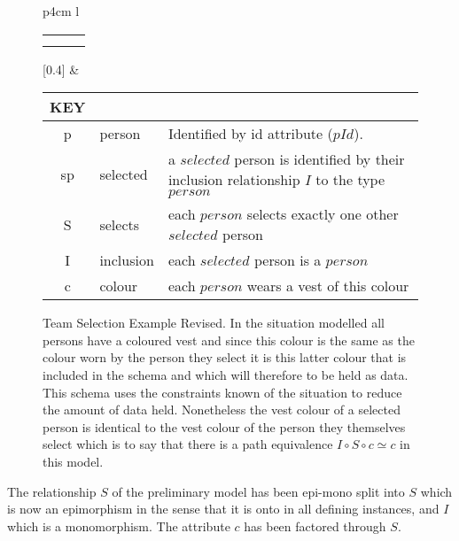 \begin{figure} [h]
\begin{center}
\begin{tabular}{p{4cm}  l }
\begin{tabular}{c p{1.5cm} c}
   \Rnode{sp}{\rnode{sps}{s}\rnode{spp}{p}} & &    \\[1.4cm]
   \Rnode{p}{p}   & & \Rnode{v}{v}
\end{tabular}
\idcomp
{}
[0.4]
\idcomp &\footnotesize
\begin{tabular}{c p{1.5cm} p{4cm}}
KEY && \\
\hline
p & person & Identified by id attribute ($pId$). \\
sp & selected & a $selected$ person is identified by their inclusion relationship $I$ to the type $person$ \\
S & selects & each $person$ selects exactly one other $selected$ person \\
I & inclusion & each $selected$ person is a $person$ \\
c & colour & each $person$ wears a vest of this colour 
\end{tabular} 
\end{tabular}
\end{center}
\caption{Team Selection Example Revised. 
In the situation modelled all persons have a coloured vest and since this colour is the same as the colour 
worn by the person they select it is this latter colour that is included in the schema and which will therefore to be held as data. 
This schema uses the constraints known of the situation to reduce the amount of data held.
Nonetheless the  vest colour  of a selected person is 
identical to the vest colour of the person they themselves select which is to say that there is a  path equivalence $I \circ S \circ c \simeq c$ in this model. 
}
\label{teamselectionrevisedERschema}
\end{figure}

\begin{categoricalaside}

The relationship $S$ of the preliminary model has been epi-mono split into $S$ which is now an epimorphism in the sense that it is onto in all defining instances,
and $I$ which is a monomorphism. The attribute $c$ has been factored through $S$.
\end{categoricalaside}


